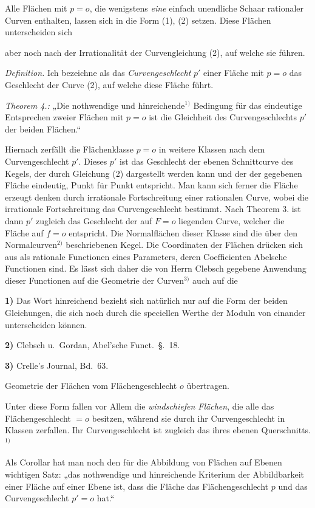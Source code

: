 \documentclass{article}
\begin{document}
Alle Flächen mit $p = o$, die wenigstens \emph{eine} einfach unendliche Schaar rationaler Curven enthalten, lassen sich in die Form (1), (2) setzen. Diese Flächen unterscheiden sich

aber noch nach der Irrationalität der Curvengleichung (2), auf welche sie führen.

\emph{Definition.} Ich bezeichne als das \emph{Curvengeschlecht} $p'$ einer Fläche mit $p = o$ das Geschlecht der Curve (2), auf welche diese Fläche führt.

\emph{Theorem 4.:} „Die nothwendige und hinreichende${}^{1)}$ Bedingung für das eindeutige Entsprechen zweier Flächen mit $p = o$ ist die Gleichheit des Curvengeschlechts $p'$ der beiden Flächen.“

Hiernach zerfällt die Flächenklasse $p = o$ in weitere Klassen nach dem Curvengeschlecht $p'$. Dieses $p'$ ist das Geschlecht der ebenen Schnittcurve des Kegels, der durch Gleichung (2) dargestellt werden kann und der der gegebenen Fläche eindeutig, Punkt für Punkt entspricht. Man kann sich ferner die Fläche erzeugt denken durch irrationale Fortschreitung einer rationalen Curve, wobei die irrationale Fortschreitung das Curvengeschlecht bestimmt. Nach Theorem 3. ist dann $p'$ zugleich das Geschlecht der auf $F = o$ liegenden Curve, welcher die Fläche auf $f = o$ entspricht. Die Normalflächen dieser Klasse sind die über den Normalcurven${}^{2)}$ beschriebenen Kegel. Die Coordinaten der Flächen drücken sich aus als rationale Functionen eines Parameters, deren Coefficienten Abelsche Functionen sind. Es lässt sich daher die von Herrn Clebsch gegebene Anwendung dieser Functionen auf die Geometrie der Curven${}^{3)}$ auch auf die

\textbf{1)} Das Wort hinreichend bezieht sich natürlich nur auf die Form der beiden Gleichungen, die sich noch durch die speciellen Werthe der Moduln von einander unterscheiden können.

\textbf{2)} Clebsch u.\ Gordan, Abel'sche Funct.\ §.\ 18.

\textbf{3)} Crelle's Journal, Bd.\ 63.

Geometrie der Flächen vom Flächengeschlecht $o$ übertragen.

Unter diese Form fallen vor Allem die \emph{windschiefen Flächen}, die alle das Flächengeschlecht $= o$ besitzen, während sie durch ihr Curvengeschlecht in Klassen zerfallen. Ihr Curvengeschlecht ist zugleich das ihres ebenen Querschnitts.${}^{1)}$

Als Corollar hat man noch den für die Abbildung von Flächen auf Ebenen wichtigen Satz: „das nothwendige und hinreichende Kriterium der Abbildbarkeit einer Fläche auf einer Ebene ist, dass die Fläche das Flächengeschlecht $p$ und das Curvengeschlecht $p' = o$ hat.“
\end{document}
